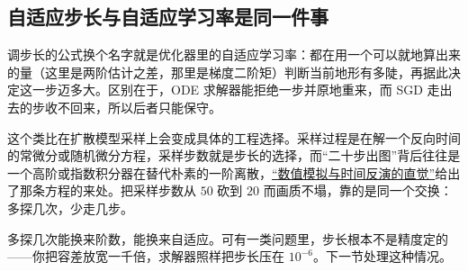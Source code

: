 \subsection{自适应步长与自适应学习率是同一件事}

调步长的公式换个名字就是优化器里的自适应学习率：都在用一个可以就地算出来的量（这里是两阶估计之差，那里是梯度二阶矩）判断当前地形有多陡，再据此决定这一步迈多大。区别在于，ODE 求解器能拒绝一步并原地重来，而 SGD 走出去的步收不回来，所以后者只能保守。

这个类比在扩散模型采样上会变成具体的工程选择。采样过程是在解一个反向时间的常微分或随机微分方程，采样步数就是步长的选择，而``二十步出图''背后往往是一个高阶或指数积分器在替代朴素的一阶离散，\hyperref[sec:06-Random-Processes/06-Diffusion-and-SDE/04]{``数值模拟与时间反演的直觉''}给出了那条方程的来处。把采样步数从 \(50\) 砍到 \(20\) 而画质不塌，靠的是同一个交换：多探几次，少走几步。

多探几次能换来阶数，能换来自适应。可有一类问题里，步长根本不是精度定的——你把容差放宽一千倍，求解器照样把步长压在 \(10^{-6}\)。下一节处理这种情况。
